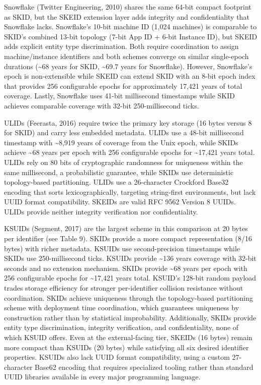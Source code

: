 \documentclass[fleqn,10pt,lineno]{wlpeerj}
\newcounter{none} %
\begin{document}
Snowflake (Twitter Engineering, 2010) shares the same 64-bit compact
footprint as SKID, but the SKEID extension layer adds integrity and
confidentiality that Snowflake lacks. Snowflake's 10-bit machine ID
(1,024 machines) is comparable to SKID's combined 13-bit topology (7-bit
App ID + 6-bit Instance ID), but SKEID adds explicit entity type
discrimination. Both require coordination to assign machine/instance
identifiers and both schemes converge on similar single-epoch durations
(\textasciitilde68 years for SKID, \textasciitilde69.7 years for
Snowflake). However, Snowflake's epoch is non-extensible while SKEID can
extend SKID with an 8-bit epoch index that provides 256 configurable
epochs for approximately 17,421 years of total coverage. Lastly,
Snowflake uses 41-bit millisecond timestamps while SKID achieves
comparable coverage with 32-bit 250-millisecond ticks.

ULIDs (Feerasta, 2016) require twice the primary key storage (16 bytes
versus 8 for SKID) and carry less embedded metadata. ULIDs use a 48-bit
millisecond timestamp with \textasciitilde8,919 years of coverage from
the Unix epoch, while SKIDs achieve \textasciitilde68 years per epoch
with 256 configurable epochs for \textasciitilde17,421 years total.
ULIDs rely on 80 bits of cryptographic randomness for uniqueness within
the same millisecond, a probabilistic guarantee, while SKIDs use
deterministic topology-based partitioning. ULIDs use a 26-character
Crockford Base32 encoding that sorts lexicographically, targeting
string-first environments, but lack UUID format compatibility. SKEIDs
are valid RFC 9562 Version 8 UUIDs. ULIDs provide neither integrity
verification nor confidentiality.

KSUIDs (Segment, 2017) are the largest scheme in this comparison at 20
bytes per identifier (see Table 9). SKIDs provide a more compact
representation (8/16 bytes) with richer metadata. KSUIDs use
second-precision timestamps while SKIDs use 250-millisecond ticks.
KSUIDs provide \textasciitilde136 years coverage with 32-bit seconds and
no extension mechanism. SKIDs provide \textasciitilde68 years per epoch
with 256 configurable epochs for \textasciitilde17,421 years total.
KSUID's 128-bit random payload trades storage efficiency for stronger
per-identifier collision resistance without coordination. SKIDs achieve
uniqueness through the topology-based partitioning scheme with
deployment time coordination, which guarantees uniqueness by
construction rather than by statistical improbability. Additionally,
SKIDs provide entity type discrimination, integrity verification, and
confidentiality, none of which KSUID offers. Even at the external-facing
tier, SKEIDs (16 bytes) remain more compact than KSUIDs (20 bytes) while
satisfying all six desired identifier properties. KSUIDs also lack UUID
format compatibility, using a custom 27-character Base62 encoding that
requires specialized tooling rather than standard UUID libraries
available in every major programming language.
\end{document}
